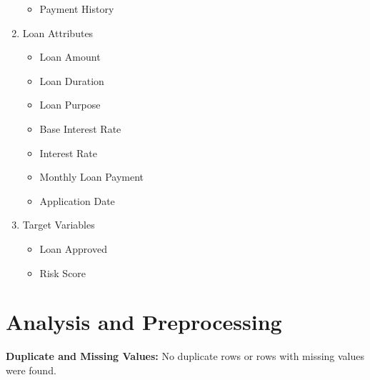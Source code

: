 \documentclass[12pt]{report}
\begin{document}
\begin{multicols}{2}
\begin{enumerate}
\begin{itemize}
        \item Payment History
    \end{itemize}
    \item Loan Attributes
    \begin{itemize}
        \item Loan Amount
        \item Loan Duration
        \item Loan Purpose
        \item Base Interest Rate
        \item Interest Rate
        \item Monthly Loan Payment
        \item Application Date
    \end{itemize}
    \item Target Variables
    \begin{itemize}
        \item Loan Approved
        \item Risk Score
    \end{itemize}
\end{enumerate}
\end{multicols}

{}
\section*{Analysis and Preprocessing}

{}
\textbf{Duplicate and Missing Values:}
No duplicate rows or rows with missing values were found.
\\ \\
\end{document}
